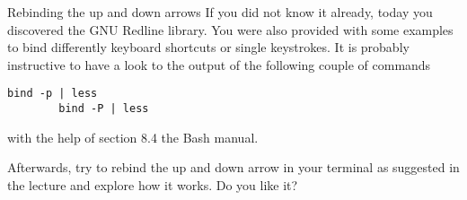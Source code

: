 
\begin{exercise}[Inspirational]{Rebinding the up and down arrows}
    If you did not know it already, today you discovered the GNU Redline library.
    You were also provided with some examples to bind differently keyboard shortcuts or single keystrokes.
    It is probably instructive to have a look to the output of the following couple of commands
    \begin{lstlisting}[style=myBash]
        bind -p | less
        bind -P | less
    \end{lstlisting}
    with the help of section 8.4 the Bash manual.

    Afterwards, try to rebind the up and down arrow in your terminal as suggested in the lecture and explore how it works.
    Do you like it?
\end{exercise}